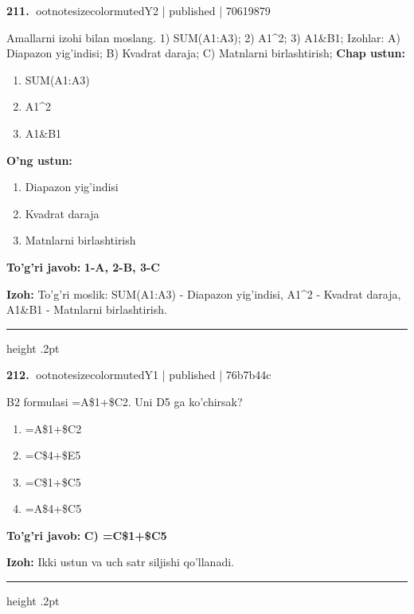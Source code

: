 \documentclass[10pt,a4paper]{article}
\begin{document}
\textbf{\color{ink}211.} {ootnotesizecolor{muted}Y2 | published | 70619879}
\par
Amallarni izohi bilan moslang.  1) SUM(A1:A3);  2) A1\textasciicircum{}2;  3) A1\&B1;  Izohlar: A) Diapazon yig'indisi;  B) Kvadrat daraja;  C) Matnlarni birlashtirish;
\textbf{Chap ustun:}\begin{enumerate}[label=\arabic*),leftmargin=9mm]
\item SUM(A1:A3)
\item A1\textasciicircum{}2
\item A1\&B1
\end{enumerate}
\textbf{O'ng ustun:}\begin{enumerate}[label=\Alph*),leftmargin=9mm]
\item Diapazon yig'indisi
\item Kvadrat daraja
\item Matnlarni birlashtirish
\end{enumerate}
\begin{tcolorbox}[enhanced,breakable,colback=teal!4,colframe=teal!55!black,boxrule=0.45pt,arc=1.2mm,left=2.8mm,right=2.8mm,top=2mm,bottom=2mm]
\textbf{\color{teal}To'g'ri javob:} \textbf{1-A, 2-B, 3-C}
\par\smallskip
\textbf{Izoh:} To'g'ri moslik: SUM(A1:A3) - Diapazon yig'indisi, A1\textasciicircum{}2 - Kvadrat daraja, A1\&B1 - Matnlarni birlashtirish.
\end{tcolorbox}
\vspace{2mm}\hrule height .2pt\vspace{2mm}

\textbf{\color{ink}212.} {ootnotesizecolor{muted}Y1 | published | 76b7b44c}
\par
B2 formulasi =A\$1+\$C2. Uni D5 ga ko'chirsak?
\begin{enumerate}[label=\Alph*),leftmargin=9mm]
\item =A\$1+\$C2
\item =C\$4+\$E5
\item =C\$1+\$C5
\item =A\$4+\$C5
\end{enumerate}
\begin{tcolorbox}[enhanced,breakable,colback=teal!4,colframe=teal!55!black,boxrule=0.45pt,arc=1.2mm,left=2.8mm,right=2.8mm,top=2mm,bottom=2mm]
\textbf{\color{teal}To'g'ri javob:} \textbf{C) =C\$1+\$C5}
\par\smallskip
\textbf{Izoh:} Ikki ustun va uch satr siljishi qo'llanadi.
\end{tcolorbox}
\vspace{2mm}\hrule height .2pt\vspace{2mm}
\end{document}
